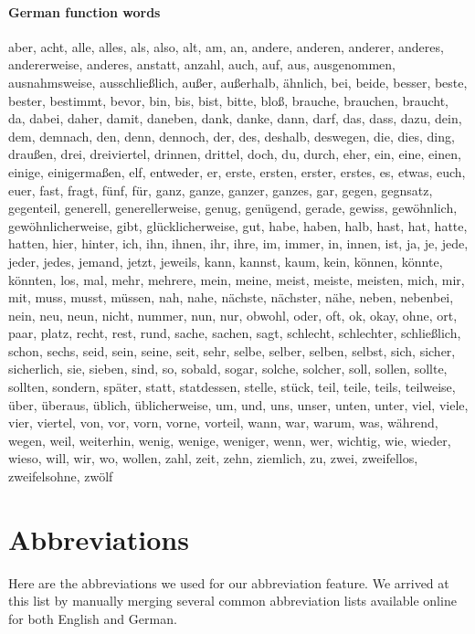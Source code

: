 \paragraph{German function words}
aber, acht, alle, alles, als, also, alt, am, an, andere, anderen, anderer, anderes, andererweise, anderes, anstatt, anzahl, auch, auf, aus, ausgenommen, ausnahmsweise, ausschließlich, außer, außerhalb, ähnlich, bei, beide, besser, beste, bester, bestimmt, bevor, bin, bis, bist, bitte, bloß, brauche, brauchen, braucht, da, dabei, daher, damit, daneben, dank, danke, dann, darf, das, dass, dazu, dein, dem, demnach, den, denn, dennoch, der, des, deshalb, deswegen, die, dies, ding, draußen, drei, dreiviertel, drinnen, drittel, doch, du, durch, eher, ein, eine, einen, einige, einigermaßen, elf, entweder, er, erste, ersten, erster, erstes, es, etwas, euch, euer, fast, fragt, fünf, für, ganz, ganze, ganzer, ganzes, gar, gegen, gegnsatz, gegenteil, generell, generellerweise, genug, genügend, gerade, gewiss, gewöhnlich, gewöhnlicherweise, gibt, glücklicherweise, gut, habe, haben, halb, hast, hat, hatte, hatten, hier, hinter, ich, ihn, ihnen, ihr, ihre, im, immer, in, innen, ist, ja, je, jede, jeder, jedes, jemand, jetzt, jeweils, kann, kannst, kaum, kein, können, könnte, könnten, los, mal, mehr, mehrere, mein, meine, meist, meiste, meisten, mich, mir, mit, muss, musst, müssen, nah, nahe, nächste, nächster, nähe, neben, nebenbei, nein, neu, neun, nicht, nummer, nun, nur, obwohl, oder, oft, ok, okay, ohne, ort, paar, platz, recht, rest, rund, sache, sachen, sagt, schlecht, schlechter, schließlich, schon, sechs, seid, sein, seine, seit, sehr, selbe, selber, selben, selbst, sich, sicher, sicherlich, sie, sieben, sind, so, sobald, sogar, solche, solcher, soll, sollen, sollte, sollten, sondern, später, statt, statdessen, stelle, stück, teil, teile, teils, teilweise, über, überaus, üblich, üblicherweise, um, und, uns, unser, unten, unter, viel, viele, vier, viertel, von, vor, vorn, vorne, vorteil, wann, war, warum, was, während, wegen, weil, weiterhin, wenig, wenige, weniger, wenn, wer, wichtig, wie, wieder, wieso, will, wir, wo, wollen, zahl, zeit, zehn, ziemlich, zu, zwei, zweifellos, zweifelsohne, zwölf


\section{Abbreviations}
\label{sec:app_abbreviations}
Here are the abbreviations we used for our abbreviation feature. We arrived at this list by manually merging several common abbreviation lists available online for both English and German.


